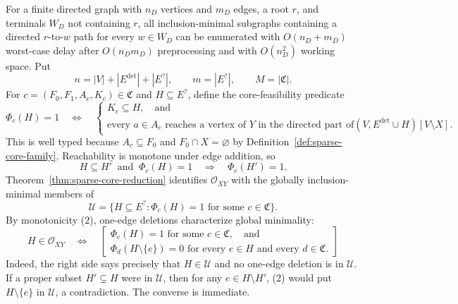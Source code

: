 For a finite directed graph with \(n_D\) vertices and \(m_D\) edges, a root \(r\), and terminals \(W_D\) not containing \(r\), all inclusion-minimal subgraphs containing a directed \(r\)-to-\(w\) path for every \(w\in W_D\) can be enumerated with \(O(n_D+m_D)\) worst-case delay after \(O(n_Dm_D)\) preprocessing and with \(O(n_D^2)\) working space.
Put
\[
 n=|V|+|E^{\mathrm{det}}|+|E^{?}|,
 \qquad m=|E^{?}|,
 \qquad M=|\mathfrak C|.
\]
For \(c=(F_0,F_1,A_c,K_c)\in\mathfrak C\) and \(H\subseteq E^{?}\), define the core-feasibility predicate
\[
 \Phi_c(H)=1
 \quad\Longleftrightarrow\quad
 \left\{
 \begin{array}{l}
 K_c\subseteq H,\quad\text{and}\\[2mm]
 \text{every }a\in A_c\text{ reaches a vertex of }Y\text{ in the directed part of}
 (V,E^{\mathrm{det}}\cup H)[V\setminus X].
 \end{array}
 \right.
 \tag{1}
\]
This is well typed because \(A_c\subseteq F_0\) and \(F_0\cap X=\varnothing\) by Definition~\ref{def:sparse-core-family}.  Reachability is monotone under edge addition, so
\[
 H\subseteq H'\ \text{ and }\ \Phi_c(H)=1
 \quad\Longrightarrow\quad
 \Phi_c(H')=1.
 \tag{2}
\]
Theorem~\ref{thm:sparse-core-reduction} identifies \(\mathcal O_{XY}\) with the globally inclusion-minimal members of
\[
 \mathscr U=\{H\subseteq E^{?}:\Phi_c(H)=1\text{ for some }c\in\mathfrak C\}.
\]
By monotonicity (2), one-edge deletions characterize global minimality:
\[
 H\in\mathcal O_{XY}
 \quad\Longleftrightarrow\quad
 \left[
 \begin{array}{l}
 \Phi_c(H)=1\text{ for some }c\in\mathfrak C,\quad\text{and}\\
 \Phi_d(H\setminus\{e\})=0
 \text{ for every }e\in H\text{ and every }d\in\mathfrak C.
 \end{array}
 \right]
 \tag{3}
\]
Indeed, the right side says precisely that \(H\in\mathscr U\) and no one-edge deletion is in \(\mathscr U\).  If a proper subset \(H'\subsetneq H\) were in \(\mathscr U\), then for any \(e\in H\setminus H'\), (2) would put \(H\setminus\{e\}\) in \(\mathscr U\), a contradiction.  The converse is immediate.

